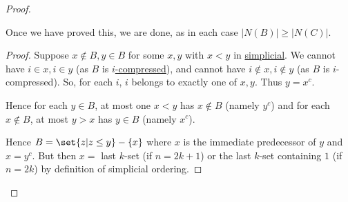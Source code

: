\documentclass{article}
\begin{document}
\begin{proof}
\begin{center}
  \end{center}
  Once we have proved this, we are done, as in each case $|N(B)| \geq |N(C)|$.
  \begin{proof}
    Suppose $x \notin B, y \in B$ for some $x,y$ with $x<y$ in \hyperlink{def:simplicial}{simplicial}.
    We cannot have $i \in x, i \in y$ (as $B$ is \hyperlink{def:icomp}{$i$-compressed}), and cannot have $i \notin x, i \notin y$ (as $B$ is $i$-compressed).
    So, for each $i$, $i$ belongs to exactly one of $x,y$.
    Thus $y = x^c$.

    Hence for each $y \in B$, at most one $x < y$ has $x \notin B$ (namely $y^c$) and for each $x \notin B$, at most $y > x$ has $y \in B$ (namely $x^c$).

    Hence $B = \set{z | z \leq y} - \{x\}$ where $x$ is the immediate predecessor of $y$ and $x = y^c$.
    But then $x=$ last $k$-set (if $n=2k+1$) or the last $k$-set containing $1$ (if $n = 2k$)
    by definition of simplicial ordering. \qedhere \qedhere
  \end{proof}
\end{proof}
\end{document}
